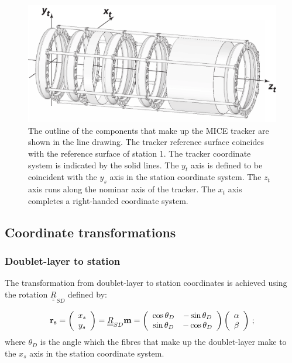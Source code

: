 \begin{figure}
  \begin{center}
    \includegraphics[width=0.7\linewidth]{detectors/tracker/03-Reference-surfaces-and-coordinate-systems/Figures/tracker.pdf}
  \end{center}
  \caption{ The outline of the components that make up the MICE tracker are shown in the line drawing. The tracker reference surface coincides with the reference surface of station 1. The tracker coordinate system is indicated by the solid lines. The $y_t$ axis is defined to be coincident with the $y_s$ axis in the station coordinate system.  The $z_t$ axis runs along the nominar axis of the tracker. The $x_t$ axis completes a right-handed coordinate system. }
  \label{Fig:TrkRef&Coord}
\end{figure}

\subsection{Coordinate transformations}
\label{SubSect:SciFiCoordTran}

\subsubsection{Doublet-layer to station}
\label{SubSubSect:SciFiDblStn}

The transformation from doublet-layer to station coordinates is achieved using the rotation $\underline{\underline{R}}_{SD}$ defined by: 

\begin{equation}
  {\bf r_s} = 
    \left(
        \begin{array}{c}
           x_s                                                      \\
           y_s
        \end{array}
    \right) = \underline{\underline{R}}_{SD} {\bf m} =
    \left(
        \begin{array}{cc}
           \cos \theta_D & -\sin \theta_D                           \\
           \sin \theta_D & -\cos \theta_D
        \end{array}
    \right) 
    \left(
        \begin{array}{c}
           \alpha                                                   \\
           \beta
        \end{array}
    \right) \, ;
\end{equation}
where $\theta_D$ is the angle which the fibres that make up the doublet-layer make to the $x_s$ axis in the station coordinate system.
